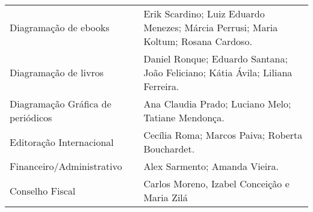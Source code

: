 \documentclass{gescons}
\begin{document}
\begin{longtable}[]{@{}
  >{\raggedright\arraybackslash}p{}
  >{\raggedright\arraybackslash}p{}@{}}
\begin{minipage}[b]{\linewidth}
\end{minipage} \\
\hline
\begin{minipage}[b]{\linewidth}\raggedright
Diagramação de ebooks
\end{minipage} & \begin{minipage}[b]{\linewidth}\raggedright\addlinespace[2pt]
Erik Scardino; Luiz Eduardo Menezes; Márcia Perrusi; Maria Koltum; Rosana Cardoso.
\end{minipage} \\
\hline
\begin{minipage}[b]{\linewidth}\raggedright
Diagramação de livros
\end{minipage} & \begin{minipage}[b]{\linewidth}\raggedright
Daniel Ronque; Eduardo Santana; João Feliciano; Kátia Ávila; Liliana Ferreira.
\end{minipage} \\
\hline
\begin{minipage}[b]{\linewidth}\raggedright
Diagramação Gráfica de periódicos
\end{minipage} & \begin{minipage}[b]{\linewidth}\raggedright
Ana Claudia Prado; Luciano Melo; Tatiane Mendonça.
\end{minipage} \\
\hline
\begin{minipage}[b]{\linewidth}\raggedright
Editoração Internacional
\end{minipage} & \begin{minipage}[b]{\linewidth}\raggedright
Cecília Roma; Marcos Paiva; Roberta Bouchardet.
\end{minipage} \\
\hline
\begin{minipage}[b]{\linewidth}\raggedright
Financeiro/Administrativo
\end{minipage} & \begin{minipage}[b]{\linewidth}\raggedright\addlinespace[2pt]
Alex Sarmento; Amanda Vieira.
\end{minipage} \\
\hline
\begin{minipage}[b]{\linewidth}\raggedright
Conselho Fiscal
\end{minipage} & \begin{minipage}[b]{\linewidth}\raggedright\addlinespace[2pt]
Carlos Moreno, Izabel Conceição e Maria Zilá
\end{minipage} \\

\end{longtable}
\end{document}
